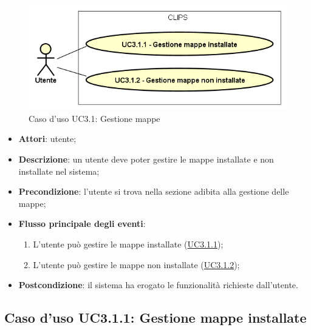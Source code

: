 \documentclass[../AnalisiDeiRequisiti.tex]{subfiles}
\begin{document}
        \begin{figure}[H]
            \centering
            \includegraphics[scale=0.95, width=\textwidth]{img/UC3-1.png}
            \caption{Caso d'uso UC3.1: Gestione mappe}\label{fig:UC3.1} 
        \end{figure}
\begin{itemize}
\item \textbf{Attori}: utente;
\item \textbf{Descrizione}: un utente deve poter gestire le mappe installate e non installate nel sistema; 
      \item \textbf{Precondizione}: l'utente si trova nella sezione adibita alla gestione delle mappe;

        \item \textbf{Flusso principale degli eventi}:
          \begin{enumerate}
          \item L'utente può gestire le mappe installate (\hyperlink{UC3.1.1}{UC3.1.1});
          \item L'utente può gestire le mappe non installate (\hyperlink{UC3.1.2}{UC3.1.2});

      \end{enumerate}
    \item \textbf{Postcondizione}: il sistema ha erogato le funzionalità richieste dall'utente.
  \end{itemize}
\hypertarget{UC3.1.1}{}
\subsection{Caso d'uso UC3.1.1: Gestione mappe installate}
\end{document}
